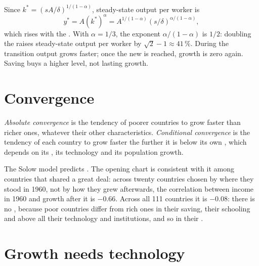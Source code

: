 Since $k^* = (sA/\delta)^{1/(1 - \alpha)}$, steady-state output per worker is
\[ y^* = A(k^*)^{\alpha} = A^{1/(1 - \alpha)}(s/\delta)^{\alpha/(1 - \alpha)}, \]
which rises with the . With
$\alpha = 1/3$, the exponent $\alpha/(1 - \alpha)$ is $1/2$: doubling the  raises steady-state output per worker by $\sqrt{2} - 1 \approx 41\,\%$. During the
transition output grows faster; once the new  is reached, growth is zero again. Saving buys a higher level, not lasting growth.

\section{Convergence}\label{sec:g12:solow-first-look:convergence}

\begin{definition}\label{def:g12:solow-first-look:absolute-convergence}
\emph{Absolute convergence} is the tendency of poorer countries to grow faster than richer ones, whatever their other characteristics.
\emph{Conditional convergence}\label{def:g12:solow-first-look:conditional-convergence} is the tendency of each country to
grow faster the further it is below its own , which depends on its , its technology and its population growth.
\end{definition}

The Solow model predicts . The opening chart is consistent with it among countries that shared a great deal: across twenty countries chosen by where
they stood in 1960, not by how they grew afterwards, the correlation between income in 1960 and growth after it is $-0.66$. Across all 111 countries it is $-0.08$: there is no , because poor countries differ from rich ones in their saving,
their schooling and above all their technology and institutions, and so in their .

\section{Growth needs technology}\label{sec:g12:solow-first-look:technology}

